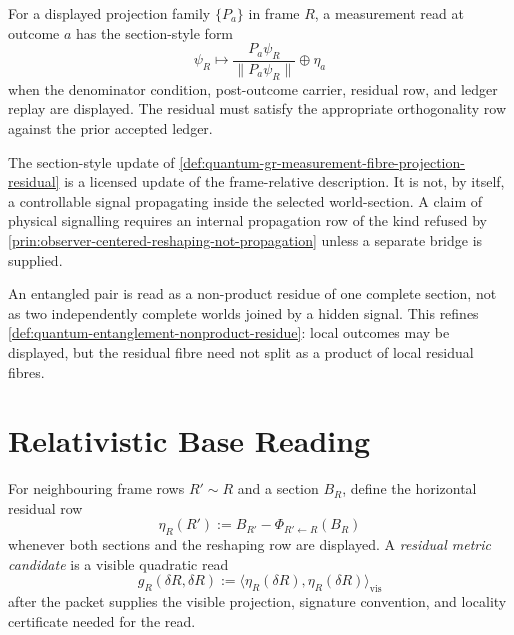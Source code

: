 \begin{definition}
\label{def:quantum-gr-measurement-fibre-projection-residual}
For a displayed projection family $\{P_a\}$ in frame $R$, a measurement
read at outcome $a$ has the section-style form
$$
\psi_R
\longmapsto
\frac{P_a\psi_R}{\|P_a\psi_R\|}
\oplus
\eta_a
$$
when the denominator condition, post-outcome carrier, residual row, and
ledger replay are displayed. The residual must satisfy the appropriate
orthogonality row against the prior accepted ledger.
\end{definition}

\begin{principle}
\label{prin:quantum-gr-collapse-not-propagation}
The section-style update of
\autoref{def:quantum-gr-measurement-fibre-projection-residual} is a
licensed update of the frame-relative description. It is not, by itself,
a controllable signal propagating inside the selected world-section. A
claim of physical signalling requires an internal propagation row of the
kind refused by
\autoref{prin:observer-centered-reshaping-not-propagation} unless a
separate bridge is supplied.
\end{principle}

\begin{principle}
\label{prin:quantum-gr-entanglement-nonproduct-section-residue}
An entangled pair is read as a non-product residue of one complete
section, not as two independently complete worlds joined by a hidden
signal. This refines
\autoref{def:quantum-entanglement-nonproduct-residue}: local outcomes may
be displayed, but the residual fibre need not split as a product of
local residual fibres.
\end{principle}

\section{Relativistic Base Reading}
\label{sec:quantum-gr-relativistic-base-reading}

\begin{definition}
\label{def:quantum-gr-residual-metric-candidate}
For neighbouring frame rows $R'\sim R$ and a section $B_R$, define the
horizontal residual row
$$
\eta_R(R')
:=
B_{R'}-\Phi_{R'\leftarrow R}(B_R)
$$
whenever both sections and the reshaping row are displayed. A
\emph{residual metric candidate} is a visible quadratic read
$$
g_R(\delta R,\delta R)
:=
\langle
\eta_R(\delta R),\eta_R(\delta R)
\rangle_{\mathrm{vis}}
$$
after the packet supplies the visible projection, signature convention,
and locality certificate needed for the read.
\end{definition}

